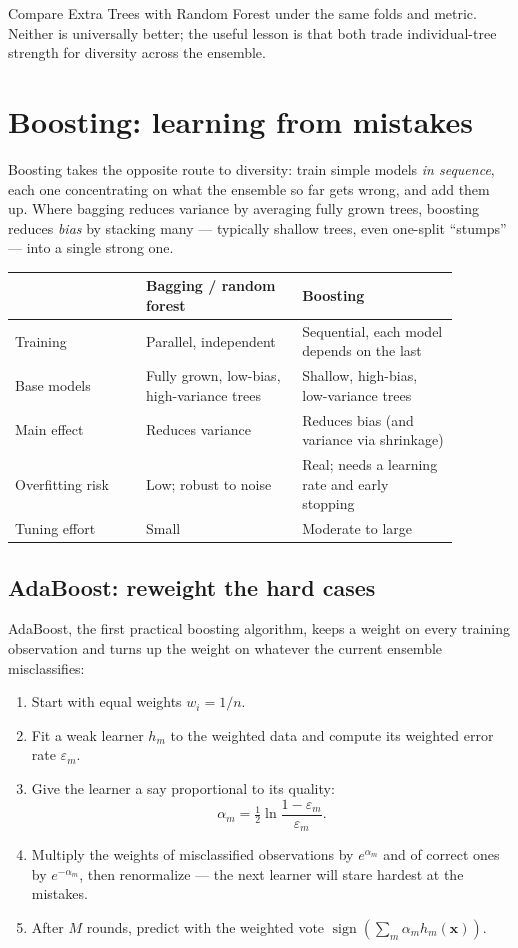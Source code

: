 Compare Extra Trees with Random Forest under the same folds and metric. Neither is universally better; the useful lesson is that both trade individual-tree strength for diversity across the ensemble.

\section{Boosting: learning from mistakes}

Boosting takes the opposite route to diversity: train simple models \emph{in sequence}, each one concentrating on what the ensemble so far gets wrong, and add them up. Where bagging reduces variance by averaging fully grown trees, boosting reduces \emph{bias} by stacking many  --- typically shallow trees, even one-split ``stumps'' --- into a single strong one.

\begin{mltable}
\begin{tabular}{@{}p{0.26\linewidth}p{0.31\linewidth}p{0.31\linewidth}@{}}
\toprule
\rowcolor{MLPaleBlue!92}
 & Bagging / random forest & Boosting \\
\midrule
Training & Parallel, independent & Sequential, each model depends on the last \\
Base models & Fully grown, low-bias, high-variance trees & Shallow, high-bias, low-variance trees \\
Main effect & Reduces variance & Reduces bias (and variance via shrinkage) \\
Overfitting risk & Low; robust to noise & Real; needs a learning rate and early stopping \\
Tuning effort & Small & Moderate to large \\
\bottomrule
\end{tabular}
\end{mltable}

\subsection{AdaBoost: reweight the hard cases}
\label{sec:adaboost}

AdaBoost, the first practical boosting algorithm, keeps a weight on every training observation and turns up the weight on whatever the current ensemble misclassifies:

\begin{enumerate}
  \item Start with equal weights $w_i=1/n$.
  \item Fit a weak learner $h_m$ to the weighted data and compute its weighted error rate $\varepsilon_m$.
  \item Give the learner a say proportional to its quality:
  \[
    \alpha_m=\tfrac{1}{2}\ln\frac{1-\varepsilon_m}{\varepsilon_m}.
  \]
  \item Multiply the weights of misclassified observations by $e^{\alpha_m}$ and of correct ones by $e^{-\alpha_m}$, then renormalize --- the next learner will stare hardest at the mistakes.
  \item After $M$ rounds, predict with the weighted vote $\operatorname{sign}\!\left(\sum_m\alpha_m h_m(\bm{x})\right)$.
\end{enumerate}

